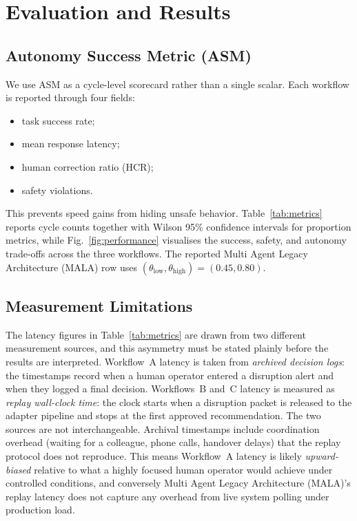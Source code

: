 \documentclass[conference]{IEEEtran}
\newcommand{\MALA}{Multi Agent Legacy Architecture (MALA)}
\begin{document}
\section{Evaluation and Results}\label{sec:eval}

\subsection{Autonomy Success Metric (ASM)}

We use ASM as a cycle-level scorecard rather than a single scalar. Each workflow is reported through four fields:
\begin{itemize}
  \item task success rate;
  \item mean response latency;
  \item human correction ratio (HCR);
  \item safety violations.
\end{itemize}

This prevents speed gains from hiding unsafe behavior. Table~\ref{tab:metrics} reports cycle counts together with Wilson 95\% confidence intervals for proportion metrics, while Fig.~\ref{fig:performance} visualises the success, safety, and autonomy trade-offs across the three workflows. The reported \MALA{} row uses $(\theta_{\text{low}}, \theta_{\text{high}}) = (0.45, 0.80)$.

\subsection{Measurement Limitations}\label{sec:meas_limits}

The latency figures in Table~\ref{tab:metrics} are drawn from two different measurement sources, and this asymmetry must be stated plainly before the results are interpreted. Workflow~A latency is taken from \emph{archived decision logs}: the timestamps record when a human operator entered a disruption alert and when they logged a final decision. Workflows~B and~C latency is measured as \emph{replay wall-clock time}: the clock starts when a disruption packet is released to the adapter pipeline and stops at the first approved recommendation. The two sources are not interchangeable. Archival timestamps include coordination overhead (waiting for a colleague, phone calls, handover delays) that the replay protocol does not reproduce. This means Workflow~A latency is likely \emph{upward-biased} relative to what a highly focused human operator would achieve under controlled conditions, and conversely \MALA{}'s replay latency does not capture any overhead from live system polling under production load.
\end{document}

